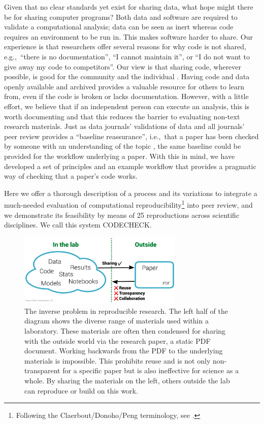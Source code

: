 \documentclass[12pt]{article}
\begin{document}
Given that no clear standards yet exist for sharing data, what hope might there be for sharing computer programs?
Both data and software are required to validate a
computational analysis; data can be seen as inert whereas
code requires an environment to be run in.
This makes software harder to share.
Our experience is that researchers offer several reasons for why code
is not shared, e.g.,~``there is no documentation'', ``I cannot maintain it'', or ``I do not want to give away my code to competitors''.
Our view is that sharing code, wherever possible, is good for the community and the individual \cite{Barnes2010-iv,markowetz_five_2015}.
Having code and data openly available and archived provides a valuable
resource for others to learn from, even if the code is broken or lacks documentation.
However, with a little effort, we believe that if an independent person can execute an analysis, this is worth documenting and that this  reduces the barrier to evaluating non-text research materials.
Just as data journals' validations of data and all journals' peer review  provides a ``baseline reassurance'', i.e.,~that a paper has been checked by someone with an understanding of the topic \cite{fyfe_mission_2019}, the same baseline could be provided for the workflow underlying a paper.
With this in mind, we have developed a set of principles and an example workflow that provides a pragmatic way of checking that a paper's code works.

Here we offer a thorough description of a process and its variations to integrate a much-needed evaluation of computational reproducibility\footnote{Following the Claerbout/Donoho/Peng terminology, see \cite{barba_terminologies_2018}.} into peer review, and we demonstrate its feasibility by means of 25 reproductions across scientific disciplines.
We call this system CODECHECK.

\begin{figure}
  \centering
  \includegraphics[width=0.7\textwidth]{figs/rr.pdf}
  \caption{The inverse problem in reproducible research. The left
  half of the diagram shows the diverse range of materials used
  within a laboratory. These materials are often then
  condensed for sharing with the outside world via the
  research paper, a static PDF document. Working backwards from the
  PDF to the underlying materials is impossible. This prohibits reuse
  and is not only non-transparent for a specific paper but is also 
  ineffective for science as a whole. By sharing the
  materials on the left, others outside the lab can reproduce
  or build on this work.}
  \label{fig:inverse}
\end{figure}
\end{document}
